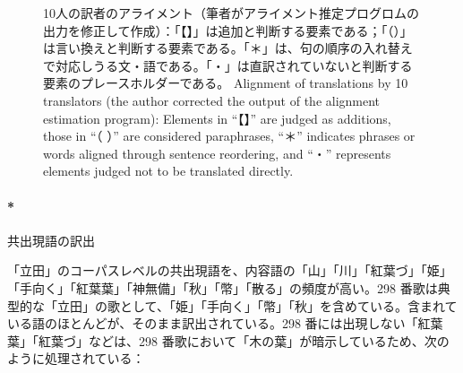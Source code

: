 \documentclass[
  letterpaper,
  DIV=11,
  numbers=noendperiod]{scrartcl}
\let\oldparagraph\paragraph
\renewcommand{\paragraph}[1]{\oldparagraph{#1}\mbox{}}
\begin{document}
\begin{figure}

\begin{minipage}{\linewidth}



\end{minipage}%
\newline
\begin{minipage}{\linewidth}



\end{minipage}%

\caption{\label{fig-alignment}10人の訳者のアライメント（筆者がアライメント推定プログロムの出力を修正して作成）：「【】」は追加と判断する要素である；「（）」は言い換えと判断する要素である。「＊」は、句の順序の入れ替えで対応しうる文・語である。「・」は直訳されていないと判断する要素のプレースホルダーである。
Alignment of translations by 10 translators (the author corrected the
output of the alignment estimation program): Elements in ``【】'' are
judged as additions, those in ``（ ）'' are considered paraphrases,
``＊'' indicates phrases or words aligned through sentence reordering,
and ``・'' represents elements judged not to be translated directly.}

\end{figure}%

\paragraph*{共出現語の訳出}\label{ux5171ux51faux73feux8a9eux306eux8a33ux51fa}

「立田」のコーパスレベルの共出現語を、内容語の「山」「川」「紅葉づ」「姫」「手向く」「紅葉葉」「神無備」「秋」「幣」「散る」の頻度が高い。298
番歌は典型的な「立田」の歌として、「姫」「手向く」「幣」「秋」を含めている。含まれている語のほとんどが、そのまま訳出されている。298
番には出現しない「紅葉葉」「紅葉づ」などは、298
番歌において「木の葉」が暗示しているため、次のように処理されている：
\end{document}
